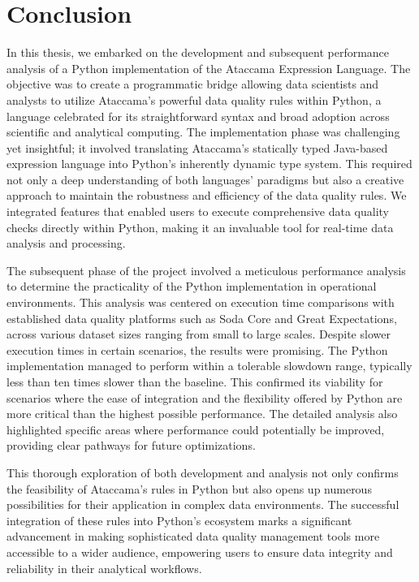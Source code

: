 \chapter*{Conclusion}

In this thesis, we embarked on the development and subsequent performance analysis of a Python implementation of the Ataccama Expression Language. The objective was to create a programmatic bridge allowing data scientists and analysts to utilize Ataccama's powerful data quality rules within Python, a language celebrated for its straightforward syntax and broad adoption across scientific and analytical computing. The implementation phase was challenging yet insightful; it involved translating Ataccama's statically typed Java-based expression language into Python’s inherently dynamic type system. This required not only a deep understanding of both languages’ paradigms but also a creative approach to maintain the robustness and efficiency of the data quality rules. We integrated features that enabled users to execute comprehensive data quality checks directly within Python, making it an invaluable tool for real-time data analysis and processing.

The subsequent phase of the project involved a meticulous performance analysis to determine the practicality of the Python implementation in operational environments. This analysis was centered on execution time comparisons with established data quality platforms such as Soda Core and Great Expectations, across various dataset sizes ranging from small to large scales. Despite slower execution times in certain scenarios, the results were promising. The Python implementation managed to perform within a tolerable slowdown range, typically less than ten times slower than the baseline. This confirmed its viability for scenarios where the ease of integration and the flexibility offered by Python are more critical than the highest possible performance. The detailed analysis also highlighted specific areas where performance could potentially be improved, providing clear pathways for future optimizations.

This thorough exploration of both development and analysis not only confirms the feasibility of Ataccama's rules in Python but also opens up numerous possibilities for their application in complex data environments. The successful integration of these rules into Python's ecosystem marks a significant advancement in making sophisticated data quality management tools more accessible to a wider audience, empowering users to ensure data integrity and reliability in their analytical workflows.